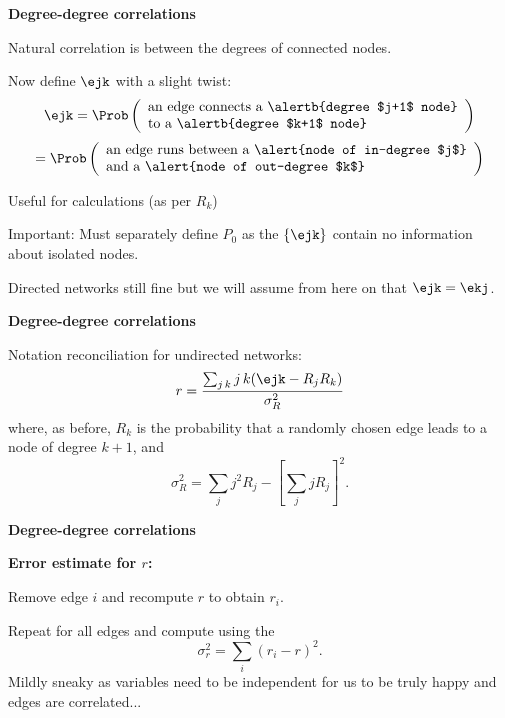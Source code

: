   \textbf{Degree-degree correlations}
  
  
  
    Natural correlation is between the degrees
    of connected nodes.
  
    Now define $\ejk$ with a slight twist:
    $$
    \ejk
      = \Prob 
      \left(
        \begin{array}{ll}
          \mbox{an edge connects a \alertb{degree $j+1$ node}} \\ 
          \mbox{to a \alertb{degree $k+1$ node}}
        \end{array}
      \right)
    $$
    {
      $$
      = \Prob 
      \left(
        \begin{array}{ll}
          \mbox{an edge runs between a \alert{node of in-degree $j$}}\\
          \mbox{and a \alert{node of out-degree $k$}}
        \end{array}
      \right)
      $$
    }
  
    Useful for calculations (as per $R_k$)
  
    \alert{Important:} Must separately define $P_0$
    as the $\{\ejk\}$ contain no information about
    isolated nodes.
  
    Directed networks still fine but we will assume
    from here on that $\ejk = \ekj$.
  


  \textbf{Degree-degree correlations}

  
  
    Notation reconciliation for undirected networks:
    $$
    r = 
    \frac{\sum_{j\, k} j\, k (\ejk - R_j R_k)}
    {\sigma_R^2}
    $$
    where, as before, $R_k$ is the probability that a 
    randomly chosen edge leads to a node of degree $k+1$,
    and
    $$
    \sigma_R^2 = 
    \sum_j j^2 R_j - 
    \left[
      \sum_j j R_j
    \right]^2.
    $$
  


  \textbf{Degree-degree correlations}
  
  \textbf{Error estimate for $r$:}
    
    
      Remove edge $i$ and recompute $r$ 
      to obtain $r_i$.
    
      Repeat for all edges and compute
      using the 
      \cite{efron1981a}
      $$
      \sigma_r^2 
      =
      \sum_{i} (r_i - r)^2.
      $$
     Mildly sneaky as variables need to be
      independent for us to be truly happy and edges
      are correlated...
    
